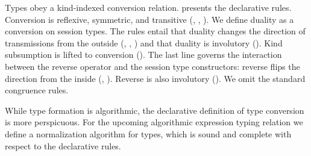 



Types obey a kind-indexed conversion
relation.  presents the declarative
rules. Conversion is reflexive, symmetric, and transitive
(, , ).
%
We define duality as a conversion on session types. The rules entail
that duality changes the direction of transmissions from the outside
(,
, )
and that duality is involutory (). Kind subsumption is lifted to conversion (). The last line
governs the interaction between the reverse operator and the session
type constructors: reverse flips the direction from the inside
(, ). Reverse is
also involutory (). We omit the standard congruence rules.




% 


While type formation is algorithmic, the declarative definition of
type conversion is more perspicuous. For the
upcoming algorithmic expression typing relation we define a normalization
algorithm for types, which is sound and complete with respect to the
declarative rules.

